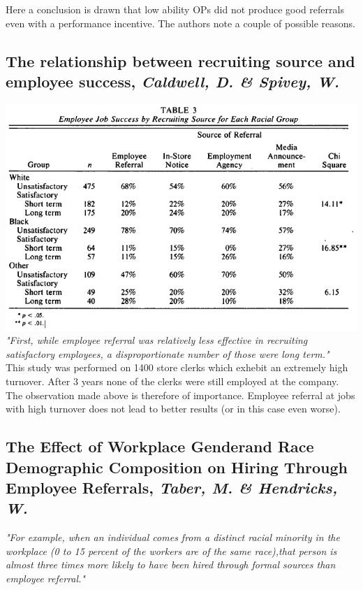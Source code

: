 \documentclass[a4paper, 11pt]{article} %
\begin{document}
Here a conclusion is drawn that low ability OPs did not produce good referrals even with a performance incentive. The authors note a couple of possible reasons.

\subsection*{The relationship between recruiting source and employee success, \emph{Caldwell, D. \& Spivey, W.} \cite{second}}

\includegraphics[width=\textwidth]{table3} \\

\emph{"First, while employee referral was relatively
less effective in recruiting satisfactory employees, a disproportionate
number of those were long term."} \\

This study was performed on 1400 store clerks which exhebit an extremely high turnover. After 3 years none of the clerks were still employed at the company. The observation made above is therefore of importance. Employee referral at jobs with high turnover does not lead to better results (or in this case even worse).

\subsection*{The Effect of Workplace Genderand Race Demographic Composition on Hiring Through Employee Referrals, \emph{Taber, M. \& Hendricks, W.} \cite{third}}

\emph{"For example, when an individual comes from a distinct racial
minority in the workplace (0 to 15 percent of the workers are of the same race),that person is almost three times more likely to have been hired through formal sources than employee referral."}\\
\end{document}
